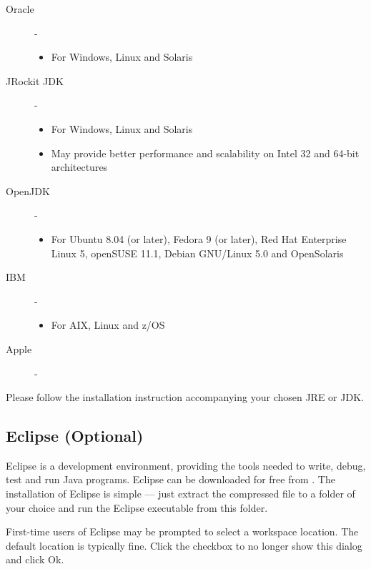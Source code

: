 \begin{description}
  \item[Oracle] - 
    \begin{itemize}
      \item For Windows, Linux and Solaris
    \end{itemize}
    
  \item[JRockit JDK] - 
    \begin{itemize}
      \item For Windows, Linux and Solaris
      \item May provide better performance and scalability on Intel 32 and 64-bit architectures
    \end{itemize}

  \item[OpenJDK] - 
    \begin{itemize}
      \item For Ubuntu 8.04 (or later), Fedora 9 (or later), Red Hat Enterprise Linux 5, openSUSE 11.1, Debian GNU/Linux 5.0 and OpenSolaris
    \end{itemize}

  \item[IBM] - 
    \begin{itemize}
      \item For AIX, Linux and z/OS
    \end{itemize}
  \item[Apple] - 
\end{description}

Please follow the installation instruction accompanying your chosen JRE or JDK.

\subsection{Eclipse (Optional)}
Eclipse is a development environment, providing the tools needed to write, debug, test and run Java programs.  Eclipse can be downloaded for free from .  The installation of Eclipse is simple --- just extract the compressed file to a folder of your choice and run the Eclipse executable from this folder.

First-time users of Eclipse may be prompted to select a workspace location.  The default location is typically fine.  Click the checkbox to no longer show this dialog and click Ok.

